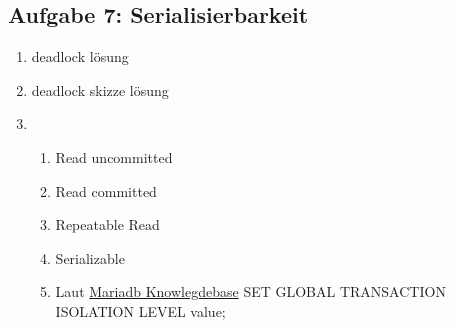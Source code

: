 \newpage
\subsection{Aufgabe 7: Serialisierbarkeit}
\label{sec:Aufgabe7}
\begin{enumerate}[label=\alph*)]
    \item deadlock lösung
    \item deadlock skizze lösung
    \item
        \begin{enumerate}[label=\arabic*]
            \item Read uncommitted
            \item Read committed
            \item Repeatable Read
            \item Serializable
            \item Laut \href{https://mariadb.com/kb/en/set-transaction/}
                {Mariadb Knowlegdebase} SET GLOBAL TRANSACTION ISOLATION LEVEL value;
        \end{enumerate}
\end{enumerate}
